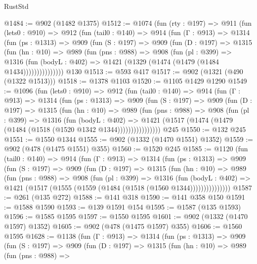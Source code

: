 \begin{lexlean}{RustStd}
\begin{coremodule}
@1484 := @902 (@1482 @1375)
@1512 := @1074
    (fun (rty : @197) =>
    @911
      (fun (lets0 : @910) =>
      @912
        (fun (tail0 : @140) =>
        @914
          (fun (Γ : @913) =>
          @1314
            (fun (ps : @1313) =>
            @909
              (fun (S : @197) =>
              @909
                (fun (D : @197) =>
                @1315
                  (fun (hn : @10) =>
                  @989
                    (fun (pns : @988) =>
                    @908
                      (fun (pl : @399) =>
                      @1316
                        (fun (bodyL : @402) =>
                        @1421 (@1329 (@1474 (@1479 (@1484 @1434)))))))))))))))
    @130
@1513 := @593 @417
@1517 := @902 (@1321 (@490 (@1322 @1513)))
@1518 := @1378 @1103
@1520 := @1105 @1429 @1290
@1549 := @1096
    (fun (lets0 : @910) =>
    @912
      (fun (tail0 : @140) =>
      @914
        (fun (Γ : @913) =>
        @1314
          (fun (ps : @1313) =>
          @909
            (fun (S : @197) =>
            @909
              (fun (D : @197) =>
              @1315
                (fun (hn : @10) =>
                @989
                  (fun (pns : @988) =>
                  @908
                    (fun (pl : @399) =>
                    @1316
                      (fun (bodyL : @402) =>
                      @1421 (@1517 (@1474 (@1479 (@1484 (@1518 (@1520 @1342 @1344))))))))))))))))
    @245
@1550 := @132 @245
@1551 := @1550 @1344
@1555 := @902 (@1332 (@1470 @1551) @1352)
@1559 := @902 (@478 (@1475 @1551) @355)
@1560 := @1520 @245
@1585 := @1120
    (fun (tail0 : @140) =>
    @914
      (fun (Γ : @913) =>
      @1314
        (fun (ps : @1313) =>
        @909
          (fun (S : @197) =>
          @909
            (fun (D : @197) =>
            @1315
              (fun (hn : @10) =>
              @989
                (fun (pns : @988) =>
                @908
                  (fun (pl : @399) =>
                  @1316
                    (fun (bodyL : @402) =>
                    @1421 (@1517 (@1555 (@1559 (@1484 (@1518 (@1560 @1344)))))))))))))))
@1587 := @261 (@135 @272)
@1588 := @141 @318
@1590 := @141 @358 @150
@1591 := @1588 @1590
@1593 := @139 @1591 @154
@1595 := @1587 (@135 @1593)
@1596 := @1585 @1595
@1597 := @1550 @1595
@1601 := @902 (@1332 (@1470 @1597) @1352)
@1605 := @902 (@478 (@1475 @1597) @355)
@1606 := @1560 @1595
@1628 := @1138
    (fun (Γ : @913) =>
    @1314
      (fun (ps : @1313) =>
      @909
        (fun (S : @197) =>
        @909
          (fun (D : @197) =>
          @1315
            (fun (hn : @10) =>
            @989
              (fun (pns : @988) =>

\end{coremodule}
\end{lexlean}
